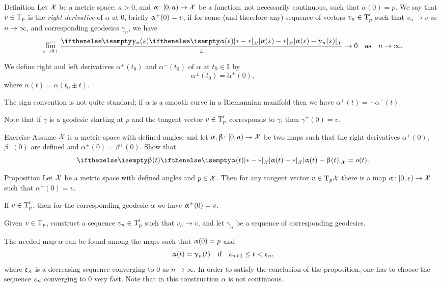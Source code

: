 \begin{thm}{Definition}\label{def:right-derivative}
Let $\mathcal{X}$ be a metric space,
$a>0$,
and $\alpha\:[0,a)\to \spc{X}$ be a function, not necessarily continuous, such that $\alpha(0)=p$.
We say that $v\in\T_p$ is the \emph{right derivative} of $\alpha$ at $0$,
briefly $\alpha^+(0)\z=v$, if for some (and therefore any) sequence of vectors $v_n\in\T'_p$ such that $v_n\to v$ as $n\to\infty$,
and corresponding geodesics $\gamma_n$, 
we have 
\[\limsup_{\eps\to0+}\frac{\dist{\alpha(\eps)}{\gamma_n(\eps)}{\spc{X}}}{\eps}\to 0\quad \text{as}\quad n\to\infty.\]

We define right and left derivatives $\alpha^+(t_0)$ and $\alpha^-(t_0)$
of $\alpha$ at $t_0\in\II$ by 
\[\alpha^\pm(t_0)=\check\alpha^+(0),\] where $\check\alpha(t)=\alpha(t_0\pm t)$.
\end{thm}

The sign convention is not quite standard; if $\alpha$ is a smooth curve in a Riemannian manifold then we have
$\alpha^+(t)=-\alpha^-(t)$.

Note that if $\gamma$ is a geodesic starting at $p$ 
and the tangent vector $v\in\T_p'$ corresponds to $\gamma$, 
then $\gamma^+(0)=v$.

\begin{thm}{Exercise}\label{ex:tangent-vect=o(t)}
Assume $\mathcal{X}$ is a metric space with defined angles,
and let $\alpha,\beta\:[0,a)\to\spc{X}$ 
be two maps such that the right derivatives $\alpha^+(0)$, $\beta^+(0)$ are defined and $\alpha^+(0)=\beta^+(0)$.
Show that
\[\dist{\alpha(t)}{\beta(t)}{\spc{X}}=o(t).\]
\end{thm}

\begin{thm}{Proposition}
Let $\mathcal{X}$ be a metric space with defined angles and $p\in \spc{X}$.
Then for any tangent vector $v\in\T_p\spc{X}$ there is a map $\alpha\:[0,\eps)\to \spc{X}$ such that $\alpha^+(0)=v$.
\end{thm}

If $v\in \T_p'$, then for the corresponding geodesic $\alpha$ we have $\alpha^+(0)\z=v$.

Given $v\in \T_p$, construct a sequence $v_n\in\T'_p$ 
such that $v_n\to v$, and let $\gamma_n$ be a sequence of corresponding geodesics.

The needed map $\alpha$ can be found among the maps such that $\alpha(0)\z=p$ and
\[\alpha(t)=\gamma_n(t)\quad \text{if}\quad \eps_{n+1}\le t<\eps_n,\]
where $\upvarepsilon_n$
is a decreasing sequence converging to $0$ as $n\to\infty$.
In order to satisfy the conclusion of the proposition, one has to choose the sequence $\upvarepsilon_n$ converging to $0$ very fast.
Note that in this construction $\alpha$ is not continuous.
\qeds

